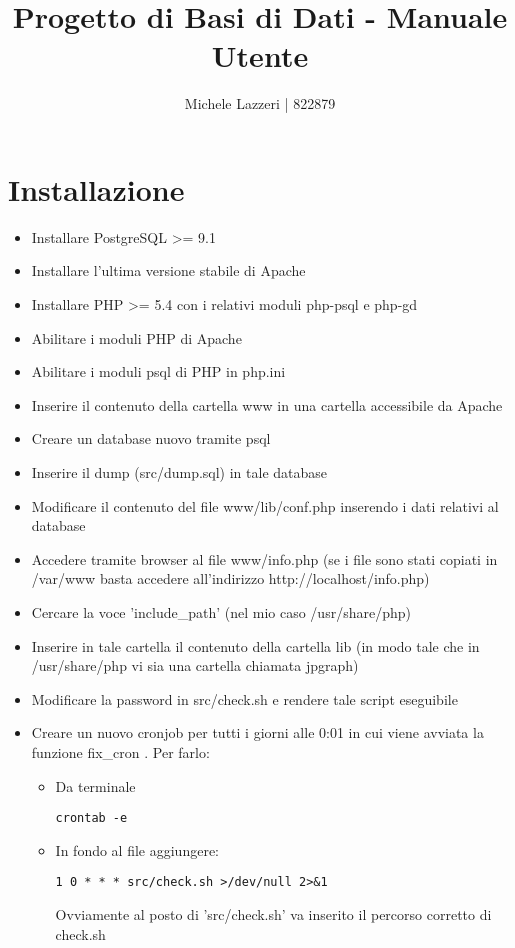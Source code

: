 \documentclass[a4paper,10pt]{article}
\title{Progetto di Basi di Dati - Manuale Utente}
\author{Michele Lazzeri | 822879}
\date{}
\begin{document}
\maketitle
\section{Installazione}
\begin{itemize}
\item Installare PostgreSQL >= 9.1
\item Installare l'ultima versione stabile di Apache
\item Installare PHP >= 5.4 con i relativi moduli php-psql e php-gd
\item Abilitare i moduli PHP di Apache
\item Abilitare i moduli psql di PHP in php.ini
\item Inserire il contenuto della cartella www in una cartella accessibile da Apache
\item Creare un database nuovo tramite psql
\item Inserire il dump (src/dump.sql) in tale database
\item Modificare il contenuto del file www/lib/conf.php inserendo i dati relativi al database
\item Accedere tramite browser al file www/info.php (se i file sono stati copiati in /var/www basta accedere all'indirizzo http://localhost/info.php)
\item Cercare la voce 'include\_{}path' (nel mio caso /usr/share/php)
\item Inserire in tale cartella il contenuto della cartella lib (in modo tale che in /usr/share/php vi sia una cartella chiamata jpgraph)
\item Modificare la password in src/check.sh e rendere tale script eseguibile
\item Creare un nuovo cronjob per tutti i giorni alle 0:01 in cui viene avviata la funzione fix\_{}cron . Per farlo:
\begin{itemize}
\item Da terminale \begin{verbatim}
crontab -e
\end{verbatim}
\item In fondo al file aggiungere:
\begin{verbatim}
1 0 * * * src/check.sh >/dev/null 2>&1
\end{verbatim}
Ovviamente al posto di 'src/check.sh' va inserito il percorso corretto di check.sh
\end{itemize}

\end{itemize}
\end{document}
